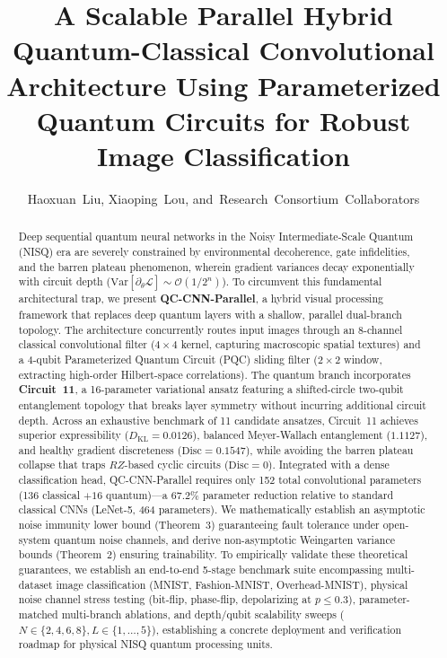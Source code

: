 \documentclass[journal]{IEEEtran}
\begin{document}
\title{A Scalable Parallel Hybrid Quantum-Classical Convolutional Architecture Using Parameterized Quantum Circuits for Robust Image Classification}

\author{Haoxuan~Liu,
        Xiaoping~Lou,
        and~Research~Consortium~Collaborators}

\maketitle

\begin{abstract}
Deep sequential quantum neural networks in the Noisy Intermediate-Scale Quantum (NISQ) era are severely constrained by environmental decoherence, gate infidelities, and the barren plateau phenomenon, wherein gradient variances decay exponentially with circuit depth ($\mathrm{Var}[\partial_\theta \mathcal{L}] \sim \mathcal{O}(1/2^n)$). To circumvent this fundamental architectural trap, we present \textbf{QC-CNN-Parallel}, a hybrid visual processing framework that replaces deep quantum layers with a shallow, parallel dual-branch topology. The architecture concurrently routes input images through an 8-channel classical convolutional filter ($4 \times 4$ kernel, capturing macroscopic spatial textures) and a 4-qubit Parameterized Quantum Circuit (PQC) sliding filter ($2 \times 2$ window, extracting high-order Hilbert-space correlations). The quantum branch incorporates \textbf{Circuit~11}, a 16-parameter variational ansatz featuring a shifted-circle two-qubit entanglement topology that breaks layer symmetry without incurring additional circuit depth. Across an exhaustive benchmark of 11 candidate ansatzes, Circuit~11 achieves superior expressibility ($D_{\mathrm{KL}} = 0.0126$), balanced Meyer-Wallach entanglement ($1.1127$), and healthy gradient discreteness ($\mathrm{Disc} = 0.1547$), while avoiding the barren plateau collapse that traps $RZ$-based cyclic circuits ($\mathrm{Disc} = 0$). Integrated with a dense classification head, QC-CNN-Parallel requires only 152 total convolutional parameters (136 classical $+ 16$ quantum)---a $67.2\%$ parameter reduction relative to standard classical CNNs (LeNet-5, 464 parameters). We mathematically establish an asymptotic noise immunity lower bound (Theorem~3) guaranteeing fault tolerance under open-system quantum noise channels, and derive non-asymptotic Weingarten variance bounds (Theorem~2) ensuring trainability. To empirically validate these theoretical guarantees, we establish an end-to-end 5-stage benchmark suite encompassing multi-dataset image classification (MNIST, Fashion-MNIST, Overhead-MNIST), physical noise channel stress testing (bit-flip, phase-flip, depolarizing at $p \le 0.3$), parameter-matched multi-branch ablations, and depth/qubit scalability sweeps ($N \in \{2,4,6,8\}, L \in \{1,\dots,5\}$), establishing a concrete deployment and verification roadmap for physical NISQ quantum processing units.
\end{abstract}
\end{document}
